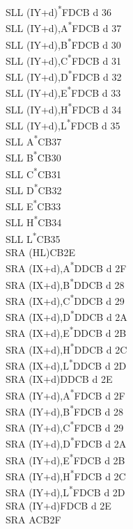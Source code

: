 \documentclass[twoside,openright,a4paper]{book}
\begin{document}
\begin{multicols}{3}
{\begin{tabbing}
	SLL (IY+d)\textsuperscript{*}\>FDCB d 36\\
	SLL (IY+d),A\textsuperscript{*}\>FDCB d 37\\
	SLL (IY+d),B\textsuperscript{*}\>FDCB d 30\\
	SLL (IY+d),C\textsuperscript{*}\>FDCB d 31\\
	SLL (IY+d),D\textsuperscript{*}\>FDCB d 32\\
	SLL (IY+d),E\textsuperscript{*}\>FDCB d 33\\
	SLL (IY+d),H\textsuperscript{*}\>FDCB d 34\\
	SLL (IY+d),L\textsuperscript{*}\>FDCB d 35\\
	SLL A\textsuperscript{*}\>CB37\\
	SLL B\textsuperscript{*}\>CB30\\
	SLL C\textsuperscript{*}\>CB31\\
	SLL D\textsuperscript{*}\>CB32\\
	SLL E\textsuperscript{*}\>CB33\\
	SLL H\textsuperscript{*}\>CB34\\
	SLL L\textsuperscript{*}\>CB35\\
	SRA (HL)\>CB2E\\
	SRA (IX+d),A\textsuperscript{*}\>DDCB d 2F\\
	SRA (IX+d),B\textsuperscript{*}\>DDCB d 28\\
	SRA (IX+d),C\textsuperscript{*}\>DDCB d 29\\
	SRA (IX+d),D\textsuperscript{*}\>DDCB d 2A\\
	SRA (IX+d),E\textsuperscript{*}\>DDCB d 2B\\
	SRA (IX+d),H\textsuperscript{*}\>DDCB d 2C\\
	SRA (IX+d),L\textsuperscript{*}\>DDCB d 2D\\
	SRA (IX+d)\>DDCB d 2E\\
	SRA (IY+d),A\textsuperscript{*}\>FDCB d 2F\\
	SRA (IY+d),B\textsuperscript{*}\>FDCB d 28\\
	SRA (IY+d),C\textsuperscript{*}\>FDCB d 29\\
	SRA (IY+d),D\textsuperscript{*}\>FDCB d 2A\\
	SRA (IY+d),E\textsuperscript{*}\>FDCB d 2B\\
	SRA (IY+d),H\textsuperscript{*}\>FDCB d 2C\\
	SRA (IY+d),L\textsuperscript{*}\>FDCB d 2D\\
	SRA (IY+d)\>FDCB d 2E\\
	SRA A\>CB2F\\

\end{tabbing}}
\end{multicols}
\end{document}
